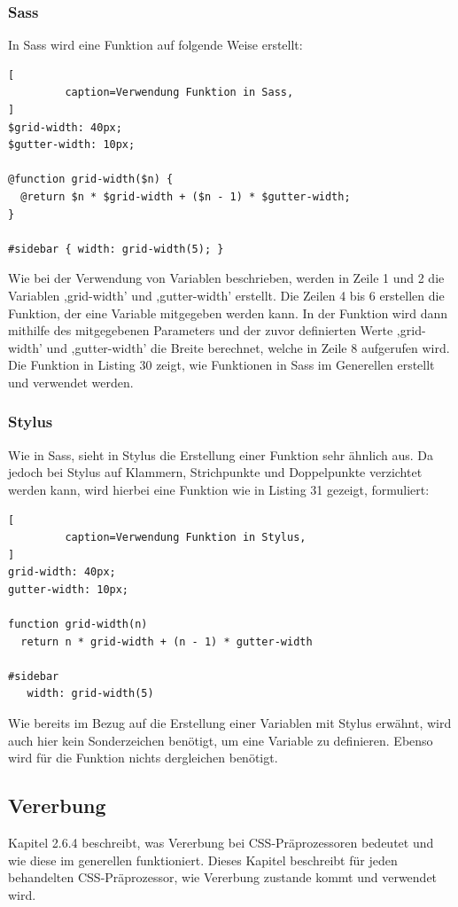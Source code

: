 \subsubsection{Sass}
In Sass wird eine Funktion auf folgende Weise erstellt:
\begin{lstlisting}[
         caption=Verwendung Funktion in Sass,
]
$grid-width: 40px;
$gutter-width: 10px;

@function grid-width($n) {
  @return $n * $grid-width + ($n - 1) * $gutter-width;
}

#sidebar { width: grid-width(5); }
\end{lstlisting}\autocite[]{Yard.2014}
Wie bei der Verwendung von Variablen beschrieben, werden in Zeile 1 und 2 die Variablen ,grid-width' und ,gutter-width' erstellt. Die Zeilen 4 bis 6 erstellen die Funktion, der eine Variable mitgegeben werden kann. In der Funktion wird dann mithilfe des mitgegebenen Parameters und der zuvor definierten Werte ,grid-width' und ,gutter-width' die Breite berechnet, welche in Zeile 8 aufgerufen wird.\newline
Die Funktion in Listing 30 zeigt, wie Funktionen in Sass im Generellen erstellt und verwendet werden.  
\subsubsection{Stylus}
Wie in Sass, sieht in Stylus die Erstellung einer Funktion sehr ähnlich aus. Da jedoch bei Stylus auf Klammern, Strichpunkte und Doppelpunkte verzichtet werden kann, wird hierbei eine Funktion wie in Listing 31 gezeigt, formuliert:
\begin{lstlisting}[
         caption=Verwendung Funktion in Stylus,
]
grid-width: 40px;
gutter-width: 10px;

function grid-width(n) 
  return n * grid-width + (n - 1) * gutter-width

#sidebar 
   width: grid-width(5)
\end{lstlisting}
Wie bereits im Bezug auf die Erstellung einer Variablen mit Stylus erwähnt, wird auch hier kein Sonderzeichen benötigt, um eine Variable zu definieren. Ebenso wird für die Funktion nichts dergleichen benötigt. \newline

\subsection{Vererbung}
Kapitel 2.6.4 beschreibt, was Vererbung bei CSS-Präprozessoren bedeutet und wie diese im generellen funktioniert. Dieses Kapitel beschreibt für jeden behandelten CSS-Präprozessor, wie Vererbung zustande kommt und verwendet wird.
